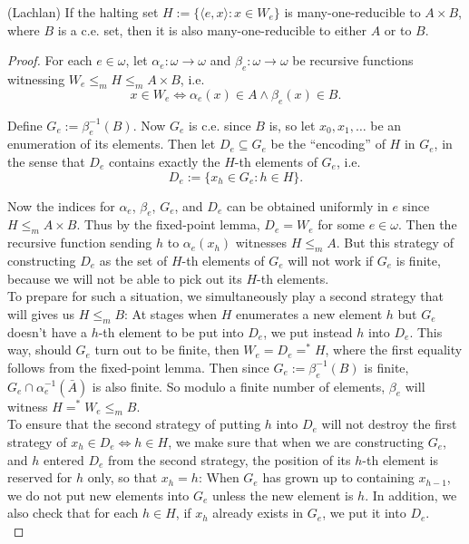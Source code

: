 \begin{theorem}
  (Lachlan) If the halting set $H:=\{\langle e,x\rangle: x\in W_e\}$ is
  many-one-reducible to $A\times B$, where $B$ is a c.e. set, then it is
  also many-one-reducible to either $A$ or to $B$.
\end{theorem}
\begin{proof}
  For each $e\in\omega$, let $\alpha_e:\omega \rightarrow\omega$ and
  $\beta_e:\omega \rightarrow\omega$ be recursive functions witnessing
  $W_e\leq_m H\leq_m A\times B$, i.e.
  \[x\in W_e \Leftrightarrow \alpha_e(x)\in A \wedge \beta_e(x)\in B.\]

  Define $G_e:=\beta_e^{-1}(B)$. Now $G_e$ is c.e. since $B$ is, so let
  $x_0,x_1,\ldots$ be an enumeration of its elements. Then let
  $D_e\subseteq G_e$ be the ``encoding'' of $H$ in $G_e$, in the sense that
  $D_e$ contains exactly the $H$-th elements of $G_e$, i.e.
  \[D_e :=\{x_h\in G_e: h\in H\}.\]

  Now the indices for $\alpha_e$, $\beta_e$, $G_e$, and $D_e$ can be
  obtained uniformly in $e$ since $H\leq_m A\times B$. Thus by the
  fixed-point lemma, $D_e=W_e$ for some $e\in\omega$. Then the recursive
  function sending $h$ to $\alpha_e(x_h)$ witnesses $H\leq_m A$. But this
  strategy of constructing $D_e$ as the set of $H$-th elements of $G_e$
  will not work if $G_e$ is finite, because we will not be able to pick out
  its $H$-th elements.\\

  To prepare for such a situation, we simultaneously play a second strategy
  that will gives us $H\leq_m B$: At stages when $H$ enumerates a new
  element $h$ but $G_e$ doesn't have a $h$-th element to be put into
  $D_e$, we put instead $h$ into $D_e$. This way, should $G_e$ turn out to
  be finite, then $W_e=D_e=^*H$, where the first equality follows from the
  fixed-point lemma. Then since $G_e:=\beta_e^{-1}(B)$ is finite,
  $G_e\cap \alpha_e^{-1}(\bar{A})$ is also finite. So modulo a finite
  number of elements, $\beta_e$ will witness $H=^*W_e\leq_m B$.\\

  To ensure that the second strategy of putting $h$ into $D_e$ will not
  destroy the first strategy of $x_h\in D_e \Leftrightarrow h\in H$, we
  make sure that when we are constructing $G_e$, and $h$ entered $D_e$ from
  the second strategy, the position of its $h$-th element is reserved for
  $h$ only, so that $x_h=h$: When $G_e$ has grown up to containing
  $x_{h-1}$, we do not put new elements into $G_e$ unless the new element
  is $h$. In addition, we also check that for each $h\in H$, if $x_h$
  already exists in $G_e$, we put it into $D_e$.\\


\end{proof}
